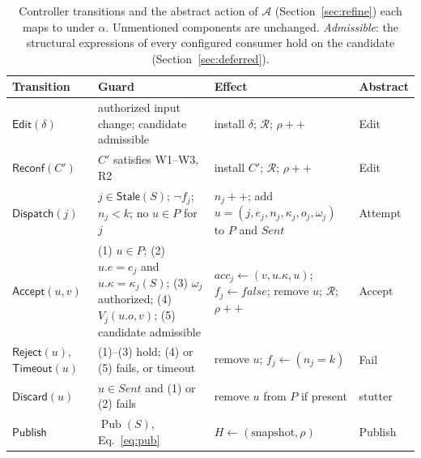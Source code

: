\documentclass[pdflatex,sn-mathphys-num]{sn-jnl}
\theoremstyle{thmstyleone}%
\theoremstyle{thmstyletwo}%
\theoremstyle{thmstylethree}%
\newcommand{\key}{\kappa}
\newcommand{\Pub}{\operatorname{Pub}}
\newcommand{\Stale}{\mathsf{Stale}}
\newcommand{\Sent}{\mathit{Sent}}
\newcommand{\Acc}{\mathsf{Accept}}
\newcommand{\Disp}{\mathsf{Dispatch}}
\begin{document}
\begin{table}[!ht]
\caption{Controller transitions and the abstract action of $\mathcal A$ (Section~\ref{sec:refine}) each maps to under $\alpha$. Unmentioned components are unchanged. \emph{Admissible}: the structural expressions of every configured consumer hold on the candidate (Section~\ref{sec:deferred}).}\label{tab:rules}
\footnotesize\setlength{\tabcolsep}{3pt}
\begin{tabular}{@{}P{16mm}P{50mm}P{44mm}P{11mm}@{}}\toprule
Transition & Guard & Effect & Abstract\\\midrule
$\mathsf{Edit}(\delta)$ & authorized input change; candidate admissible & install $\delta$; $\mathcal R$; $\rho{+}{+}$ & Edit\\
$\mathsf{Reconf}(C')$ & $C'$ satisfies W1--W3, R2 & install $C'$; $\mathcal R$; $\rho{+}{+}$ & Edit\\
$\Disp(j)$ & $j\in\Stale(S)$; $\neg f_j$; $n_j<k$; no $u\in P$ for $j$ & $n_j{+}{+}$; add $u=(j,e_j,n_j,\key_j,o_j,\omega_j)$ to $P$ and $\Sent$ & Attempt\\
$\Acc(u,v)$ & (1) $u\in P$; (2) $u.e=e_j$ and $u.\key=\key_j(S)$; (3) $\omega_j$ authorized; (4) $V_j(u.o,v)$; (5) candidate admissible & $\mathit{acc}_j\gets(v,u.\key,u)$; $f_j\gets\mathit{false}$; remove $u$; $\mathcal R$; $\rho{+}{+}$ & Accept\\
$\mathsf{Reject}(u)$, $\mathsf{Timeout}(u)$ & (1)--(3) hold; (4) or (5) fails, or timeout & remove $u$; $f_j\gets(n_j=k)$ & Fail\\
$\mathsf{Discard}(u)$ & $u\in\Sent$ and (1) or (2) fails & remove $u$ from $P$ if present & stutter\\
$\mathsf{Publish}$ & $\Pub(S)$, Eq.~\eqref{eq:pub} & $H\gets(\text{snapshot},\rho)$ & Publish\\\bottomrule
\end{tabular}
\end{table}
\end{document}

